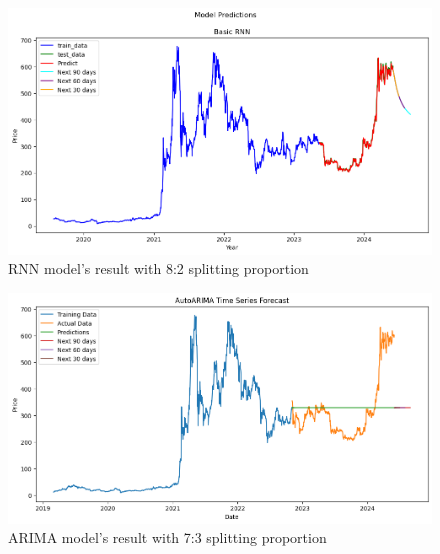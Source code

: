 \documentclass{ieeeojies}
\begin{document}
\begin{figure}[H]
  \centering
  \begin{minipage}{0.8\linewidth}
    \centering
    \includegraphics[width=\linewidth]{Image/RNN/RNN_BNB82.png}
    \caption{RNN model's result with 8:2 splitting proportion}
    \label{fig:19}
  \end{minipage}
\end{figure}
\vspace{-5mm}
\begin{figure}[H]
  \centering
  \begin{minipage}{0.8\linewidth}
    \centering
    \includegraphics[width=\linewidth]{Image/Arima/Arima_BNB_7_3_n.png}
    \caption{ARIMA model's result with 7:3 splitting proportion}
    \label{fig:20}
  \end{minipage}
\end{figure}
\vspace{-5mm}
\end{document}
